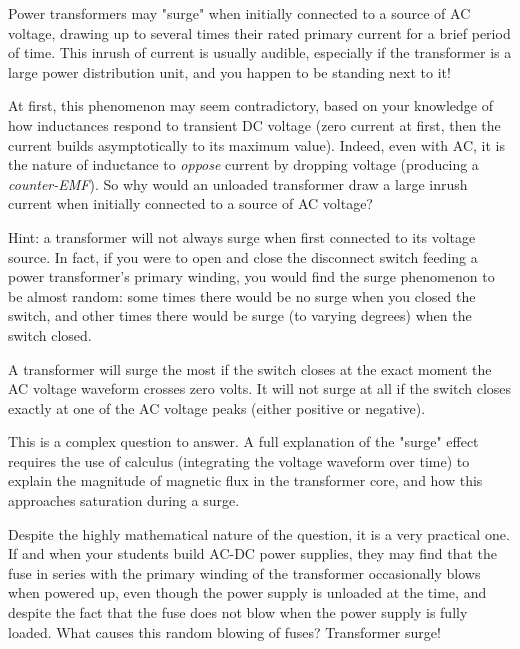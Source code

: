 

Power transformers may "surge" when initially connected to a source of AC voltage, drawing up to several times their rated primary current for a brief period of time.  This inrush of current is usually audible, especially if the transformer is a large power distribution unit, and you happen to be standing next to it!

At first, this phenomenon may seem contradictory, based on your knowledge of how inductances respond to transient DC voltage (zero current at first, then the current builds asymptotically to its maximum value).  Indeed, even with AC, it is the nature of inductance to {\it oppose} current by dropping voltage (producing a {\it counter-EMF}).  So why would an unloaded transformer draw a large inrush current when initially connected to a source of AC voltage?

\vskip 5pt

Hint: a transformer will not always surge when first connected to its voltage source.  In fact, if you were to open and close the disconnect switch feeding a power transformer's primary winding, you would find the surge phenomenon to be almost random: some times there would be no surge when you closed the switch, and other times there would be surge (to varying degrees) when the switch closed.







A transformer will surge the most if the switch closes at the exact moment the AC voltage waveform crosses zero volts.  It will not surge at all if the switch closes exactly at one of the AC voltage peaks (either positive or negative).







This is a complex question to answer.  A full explanation of the "surge" effect requires the use of calculus (integrating the voltage waveform over time) to explain the magnitude of magnetic flux in the transformer core, and how this approaches saturation during a surge.

Despite the highly mathematical nature of the question, it is a very practical one.  If and when your students build AC-DC power supplies, they may find that the fuse in series with the primary winding of the transformer occasionally blows when powered up, even though the power supply is unloaded at the time, and despite the fact that the fuse does not blow when the power supply is fully loaded.  What causes this random blowing of fuses?  Transformer surge!




